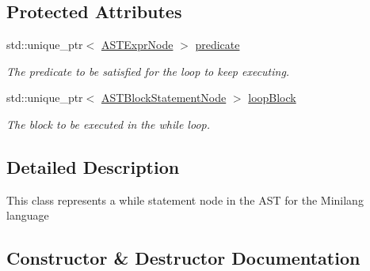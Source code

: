 \subsection*{Protected Attributes}
\begin{DoxyCompactItemize}
\item 
\mbox{\label{classparser_1_1ast_1_1ASTWhileStatementNode_aef13a0ab19cfd381066af8c066e341e1}} 
std\+::unique\+\_\+ptr$<$ \hyperlink{classparser_1_1ast_1_1ASTExprNode}{A\+S\+T\+Expr\+Node} $>$ \hyperlink{classparser_1_1ast_1_1ASTWhileStatementNode_aef13a0ab19cfd381066af8c066e341e1}{predicate}
\begin{DoxyCompactList}\small\item\em The predicate to be satisfied for the loop to keep executing. \end{DoxyCompactList}\item 
\mbox{\label{classparser_1_1ast_1_1ASTWhileStatementNode_ae88c633373308600c37d89db84980363}} 
std\+::unique\+\_\+ptr$<$ \hyperlink{classparser_1_1ast_1_1ASTBlockStatementNode}{A\+S\+T\+Block\+Statement\+Node} $>$ \hyperlink{classparser_1_1ast_1_1ASTWhileStatementNode_ae88c633373308600c37d89db84980363}{loop\+Block}
\begin{DoxyCompactList}\small\item\em The block to be executed in the while loop. \end{DoxyCompactList}\end{DoxyCompactItemize}


\subsection{Detailed Description}
This class represents a while statement node in the A\+ST for the Minilang language 

\subsection{Constructor \& Destructor Documentation}
\mbox{\label{classparser_1_1ast_1_1ASTWhileStatementNode_a099a29ffe3bca12fac6a7904d52b9c6a}} 
